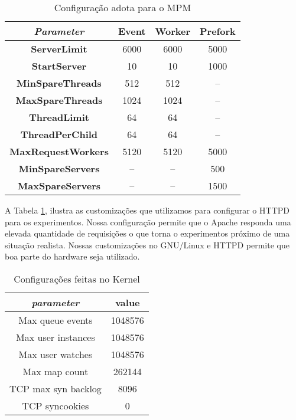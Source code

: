 \begin{table} \centering \begin{tabular}{|c|c|c|c|} \hline \textit{Parameter} &
\textbf{Event} & \textbf{Worker} & \textbf{Prefork} \\ \hline
\textbf{ServerLimit} & 6000 & 6000 & 5000\\ \hline \textbf{StartServer} & 10 &
10 & 1000\\ \hline \textbf{MinSpareThreads} & 512 & 512 & --\\ \hline
\textbf{MaxSpareThreads} & 1024 & 1024 & --\\ \hline \textbf{ThreadLimit} & 64
& 64 & --\\ \hline \textbf{ThreadPerChild} & 64 & 64 & --\\ \hline
\textbf{MaxRequestWorkers} & 5120 & 5120 & 5000\\ \hline
\textbf{MinSpareServers} & -- & -- & 500\\ \hline \textbf{MaxSpareServers} & --
& -- & 1500\\ \hline \end{tabular} \caption{Configuração adota para o MPM}
\label{tab:configuration} \end{table}

A Tabela \ref{tab:configuration}, ilustra as customizações que utilizamos para
configurar o HTTPD para os experimentos. Nossa configuração permite que o
Apache responda uma elevada quantidade de requisições o que torna o
experimentos próximo de uma situação realista. Nossas customizações no
GNU/Linux e HTTPD permite que boa parte do hardware seja utilizado.

\begin{table} \centering \begin{tabular}{|c|c|} \hline \textit{parameter} &
\textbf{value}\\ \hline Max queue events & 1048576\\ \hline Max user instances
& 1048576\\ \hline Max user watches & 1048576\\ \hline Max map count & 262144\\
\hline TCP max syn backlog & 8096\\ \hline TCP syncookies & 0\\ \hline
\end{tabular} \caption{Configurações feitas no Kernel}
\label{tab:kernel_config} \end{table}

